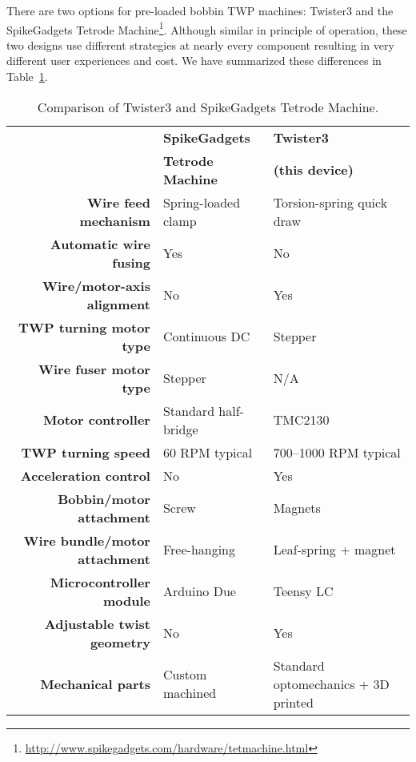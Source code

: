 \documentclass[11pt,a4paper]{article}
\begin{document}
There are two options for pre-loaded bobbin TWP machines: Twister3 and the
SpikeGadgets Tetrode
Machine\footnote{\url{http://www.spikegadgets.com/hardware/tetmachine.html}}.
Although similar in principle of operation, these two designs use different
strategies at nearly every component resulting in very different user
experiences and cost. We have summarized these differences in
Table~\ref{t:compare}.

\setlength{\tabcolsep}{10pt}

\begin{table}[!htbp]
\centering
\caption{Comparison of Twister3 and SpikeGadgets Tetrode Machine.}
\label{t:compare}

\begin{tabular}{rll}
\toprule
&
\textbf{SpikeGadgets} &
\textbf{Twister3} \\
&
\textbf{Tetrode Machine} &
\textbf{(this device)} \\

\cmidrule{2-3}

\textbf{Wire feed mechanism}            & Spring-loaded clamp   & Torsion-spring quick draw  \\
\textbf{Automatic wire fusing}          & Yes                   & No \\
\textbf{Wire/motor-axis alignment}      & No                    & Yes \\
\textbf{TWP turning motor type}         & Continuous DC         & Stepper \\
\textbf{Wire fuser motor type}          & Stepper               & N/A \\
\textbf{Motor controller}               & Standard half-bridge  & TMC2130 \\
\textbf{TWP turning speed}              & 60 RPM typical        & 700--1000 RPM typical \\
\textbf{Acceleration control}           & No                    & Yes \\
\textbf{Bobbin/motor attachment}        & Screw                 & Magnets \\
\textbf{Wire bundle/motor attachment}   & Free-hanging          & Leaf-spring + magnet \\
\textbf{Microcontroller module}         & Arduino Due           & Teensy LC \\
\textbf{Adjustable twist geometry }     & No                    & Yes \\
\textbf{Mechanical parts}               & Custom machined       & Standard optomechanics + 3D printed \\
\bottomrule
\end{tabular}
\end{table}
\end{document}

